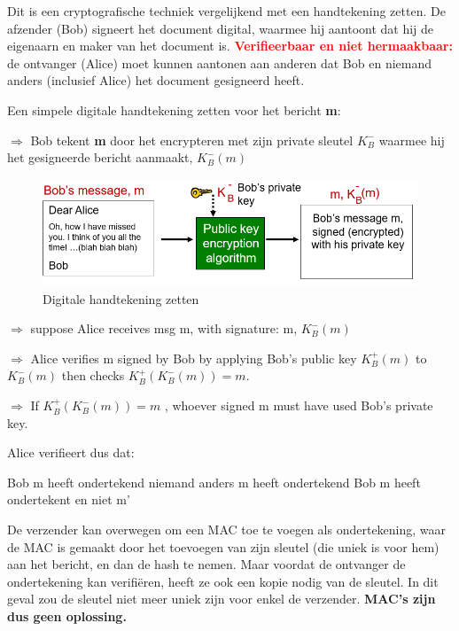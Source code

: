 \noindent Dit is een cryptografische techniek vergelijkend met een handtekening zetten.
\bi
\itf De afzender (Bob) signeert het document digital, waarmee hij aantoont dat hij de eigenaarn en maker van het document is. 
\itf \textcolor{red}{\textbf{Verifieerbaar en niet hermaakbaar:}} de ontvanger (Alice) moet kunnen aantonen aan anderen dat Bob en niemand anders (inclusief Alice) het document gesigneerd heeft.
\ei

\noindent Een simpele digitale handtekening zetten voor het bericht \textbf{m}:

\noindent $\Rightarrow$ Bob tekent \textbf{m} door het encrypteren met zijn private sleutel $K^-_B$ waarmee hij het gesigneerde bericht aanmaakt, $K^-_B (m)$


\begin{figure}[h]
    \centering
    \includegraphics[width=7in]{./img/imghfdst8/hfdst8puntje7.png}
    \caption{Digitale handtekening zetten }      
    \label{fig:Digitale handtekening zetten  }
\end{figure}

\noindent $\Rightarrow$ suppose Alice receives msg m, with signature: m,  $K^-_B (m)$

\noindent $\Rightarrow$ Alice verifies m signed by Bob by applying Bob’s public key  $K^+_B (m)$ to  $K^-_B (m)$ then checks  $K^+_B (K^-_B (m)) = m $.

\noindent $\Rightarrow$ If $K^+_B (K^-_B (m)) = m $ , whoever signed m must have used Bob’s private key.

\noindent Alice verifieert dus dat:

\bi
\itf Bob m heeft ondertekend
\itf niemand anders m heeft ondertekend
\itf Bob m heeft ondertekent en niet m'
\ei

\noindent De verzender kan overwegen om een MAC toe te voegen als ondertekening, waar de MAC is gemaakt door het toevoegen van zijn sleutel (die uniek is voor hem) aan het bericht, en dan de hash te nemen. Maar voordat de ontvanger de ondertekening kan verifiëren, heeft ze ook een kopie nodig van de sleutel. In dit geval zou de sleutel niet meer uniek zijn voor enkel de verzender. \textbf{MAC’s zijn dus geen oplossing.}


